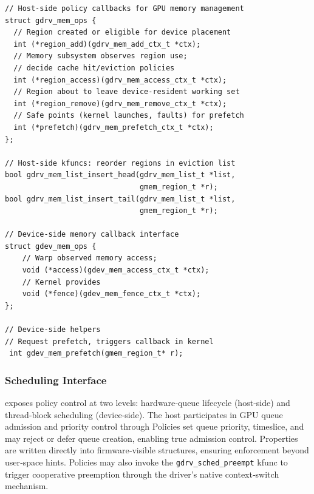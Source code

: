 \begin{verbatim}
// Host-side policy callbacks for GPU memory management
struct gdrv_mem_ops {
  // Region created or eligible for device placement
  int (*region_add)(gdrv_mem_add_ctx_t *ctx);
  // Memory subsystem observes region use;
  // decide cache hit/eviction policies
  int (*region_access)(gdrv_mem_access_ctx_t *ctx);
  // Region about to leave device-resident working set
  int (*region_remove)(gdrv_mem_remove_ctx_t *ctx);
  // Safe points (kernel launches, faults) for prefetch
  int (*prefetch)(gdrv_mem_prefetch_ctx_t *ctx);
};

// Host-side kfuncs: reorder regions in eviction list
bool gdrv_mem_list_insert_head(gdrv_mem_list_t *list,
                               gmem_region_t *r);
bool gdrv_mem_list_insert_tail(gdrv_mem_list_t *list,
                               gmem_region_t *r);

// Device-side memory callback interface
struct gdev_mem_ops {
    // Warp observed memory access;
    void (*access)(gdev_mem_access_ctx_t *ctx);
    // Kernel provides
    void (*fence)(gdev_mem_fence_ctx_t *ctx);
};

// Device-side helpers
// Request prefetch, triggers callback in kernel
 int gdev_mem_prefetch(gmem_region_t* r);
\end{verbatim}




\subsubsection{Scheduling Interface}
\label{sec:design-sched}

\sys exposes policy control at two levels: hardware‑queue lifecycle (host‑side) and thread‑block scheduling (device‑side). The host participates in GPU queue admission and priority control through Policies set queue priority, timeslice, and may reject or defer queue creation, enabling true admission control. Properties are written directly into firmware‑visible structures, ensuring enforcement beyond user‑space hints. Policies may also invoke the \texttt{gdrv\_sched\_preempt} kfunc to trigger cooperative preemption through the driver’s native context‑switch mechanism.

